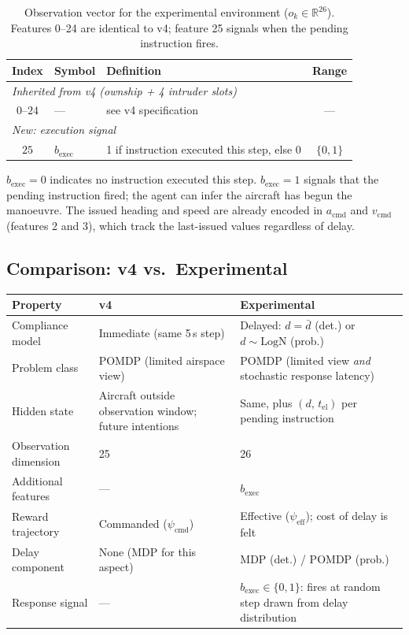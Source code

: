 \documentclass[11pt, a4paper]{article}
\begin{document}
\begin{table}[h]\centering
\begin{tabular}{cllc}
\toprule
Index & Symbol & Definition & Range\\
\midrule
\multicolumn{4}{l}{\emph{Inherited from v4 (ownship + 4 intruder slots)}}\\
$0$--$24$ & --- & see v4 specification & ---\\[3pt]
\multicolumn{4}{l}{\emph{New: execution signal}}\\
$25$ & $b_\text{exec}$         & 1 if instruction executed this step, else 0 & $\{0,1\}$\\
\bottomrule
\end{tabular}
\caption{Observation vector for the experimental environment ($o_k\in\mathbb{R}^{26}$). Features 0--24 are identical to v4; feature 25 signals when the pending instruction fires.}
\end{table}

\noindent$b_\text{exec}=0$ indicates no instruction executed this step. $b_\text{exec}=1$ signals that the pending instruction fired; the agent can infer the aircraft has begun the manoeuvre. The issued heading and speed are already encoded in $a_\text{cmd}$ and $v_\text{cmd}$ (features 2 and 3), which track the last-issued values regardless of delay.

\subsection{Comparison: v4 vs.\ Experimental}

\begin{table}[h]\centering
\begin{tabular}{p{3.8cm}p{4.8cm}p{5.0cm}}
\toprule
Property & v4 & Experimental\\
\midrule
Compliance model
  & Immediate (same 5\,s step)
  & Delayed: $d=\bar{d}$ (det.) or $d\sim\mathrm{LogN}$ (prob.)\\[3pt]
Problem class
  & POMDP (limited airspace view)
  & POMDP (limited view \emph{and} stochastic response latency)\\[3pt]
Hidden state
  & Aircraft outside observation window; future intentions
  & Same, plus $(d,\,t_\text{el})$ per pending instruction\\[3pt]
Observation dimension
  & 25
  & 26\\[3pt]
Additional features
  & ---
  & $b_\text{exec}$\\[3pt]
Reward trajectory
  & Commanded ($\psi_\text{cmd}$)
  & Effective ($\psi_\text{eff}$); cost of delay is felt\\[3pt]
Delay component
  & None (MDP for this aspect)
  & MDP (det.) / POMDP (prob.)\\[3pt]
Response signal
  & ---
  & $b_\text{exec}\in\{0,1\}$: fires at random step drawn from delay distribution\\
\bottomrule
\end{tabular}
\end{table}
\end{document}
